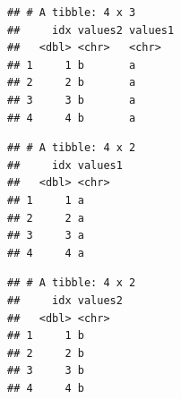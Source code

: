\documentclass[krantz2]{krantz}\usepackage{knitr}%
\begin{document}
\begin{knitrout}\footnotesize
{}\color{fgcolor}\begin{kframe}
\begin{alltt}
\end{alltt}


{\ttfamily\noindent\itshape{}}\begin{verbatim}
## # A tibble: 4 x 3
##     idx values2 values1
##   <dbl> <chr>   <chr>  
## 1     1 b       a      
## 2     2 b       a      
## 3     3 b       a      
## 4     4 b       a
\end{verbatim}
\end{kframe}
\end{knitrout}

\begin{knitrout}\footnotesize
{}\color{fgcolor}\begin{kframe}
\begin{alltt}
\end{alltt}


{\ttfamily\noindent\itshape{}}\begin{verbatim}
## # A tibble: 4 x 2
##     idx values1
##   <dbl> <chr>  
## 1     1 a      
## 2     2 a      
## 3     3 a      
## 4     4 a
\end{verbatim}
\end{kframe}
\end{knitrout}

\begin{knitrout}\footnotesize
{}\color{fgcolor}\begin{kframe}
\begin{alltt}
\end{alltt}


{\ttfamily\noindent\itshape{}}\begin{verbatim}
## # A tibble: 4 x 2
##     idx values2
##   <dbl> <chr>  
## 1     1 b      
## 2     2 b      
## 3     3 b      
## 4     4 b
\end{verbatim}
\end{kframe}
\end{knitrout}
\end{document}
